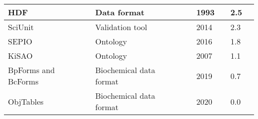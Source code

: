 \begin{longtable}{L{2.2cm}L{4cm}L{1cm}L{0.8cm}R{1.1cm}R{1cm}R{1cm}}
\midrule
\small{HDF} &\small{Data format} &\cite{Brown1993SoftwareManagement} &\small{1993} &\small{} &\small{2.5} &\small{}\\
\midrule
\small{SciUnit} &\small{Validation tool} &\cite{Omar2014CollaborativeValidation} &\small{2014} &\small{} &\small{2.3} &\small{}\\
\midrule
\small{SEPIO} &\small{Ontology} &\cite{Brush2016SEPIO:Evidence} &\small{2016} &\small{} &\small{1.8} &\small{}\\
\midrule
\small{KiSAO} &\small{Ontology} &\cite{Zhukova2011KineticOntology} &\small{2007} &\small{} &\small{1.1} &\small{}\\
\midrule
\small{BpForms and BcForms} &\small{Biochemical data format} &\cite{Lang2019BpForms:Proteins} &\small{2019} &\small{} &\small{0.7} &\small{}\\
\midrule
\small{ObjTables} &\small{Biochemical data format} &\cite{karr2020structured} &\small{2020} &\small{} &\small{0.0} &\small{}\\
\bottomrule\end{longtable}
